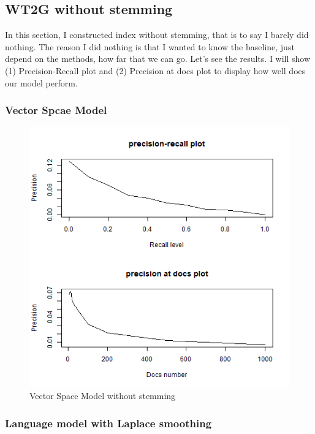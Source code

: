 \documentclass[a4pper,11pt,onecolumn]{article}
\begin{document}
\subsection{WT2G without stemming}
In this section, I constructed index without stemming, that is to say I barely did nothing. The reason I did nothing is that I wanted to know the baseline, just depend on the methods, how far that we can go.
Let's see the results. I will show (1) Precision-Recall plot and (2) Precision at docs plot to display how well does our model perform.

\subsubsection{Vector Spcae Model}

    \begin{figure}[H]
    \centering
    \includegraphics[scale = 0.6]{model2.png}
    \caption{Vector Space Model without stemming}
    \end{figure}
\subsubsection{Language model with Laplace smoothing}
\end{document}
